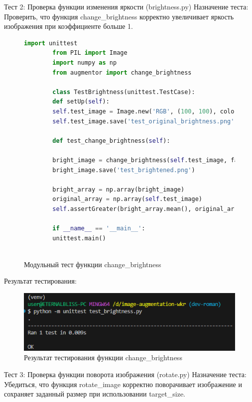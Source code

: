 Тест 2: Проверка функции изменения яркости (brightness.py)
Назначение теста: Проверить, что функция change\_brightness корректно увеличивает яркость изображения при коэффициенте больше 1.

\begin{figure}[H]
	\begin{lstlisting}[language=Python]
		import unittest
		from PIL import Image
		import numpy as np
		from augmentor import change_brightness
		
		class TestBrightness(unittest.TestCase):
		def setUp(self):
		self.test_image = Image.new('RGB', (100, 100), color=(128, 128, 128))
		self.test_image.save('test_original_brightness.png')
		
		def test_change_brightness(self):
		
		bright_image = change_brightness(self.test_image, factor=1.5)
		bright_image.save('test_brightened.png')
		
		bright_array = np.array(bright_image)
		original_array = np.array(self.test_image)
		self.assertGreater(bright_array.mean(), original_array.mean(), "Яркость не увеличилась.")
		
		if __name__ == '__main__':
		unittest.main()



	\end{lstlisting}  
	\caption{Модульный тест функции change\_brightness}
	\label{model_test:test2}
\end{figure}

Результат тестирования:
\begin{figure}[H]
	\centering
	\includegraphics[width=0.7\linewidth]{images/resulttest2}
	\caption{Результат тестирования функции change\_brightness}
	\label{fig:resulttest2}
\end{figure}

Тест 3: Проверка функции поворота изображения (rotate.py)
Назначение теста: Убедиться, что функция rotate\_image корректно поворачивает изображение и сохраняет заданный размер при использовании target\_size.

